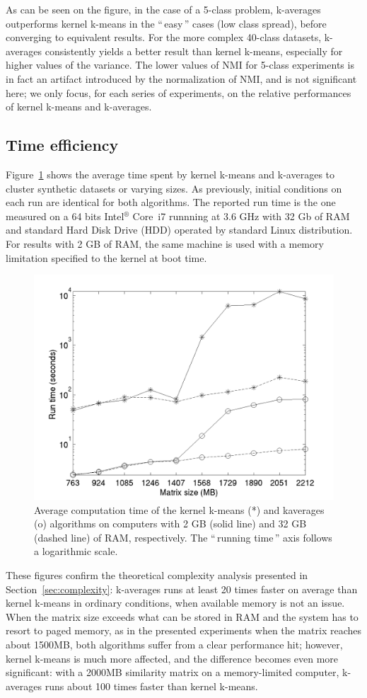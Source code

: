 \documentclass[twoside,11pt]{article}
\newcommand{\gl}[1]{``\,#1\,''} %
\begin{document}
As can be seen on the figure, in the case of a 5-class problem, k-averages outperforms kernel k-means in the \gl{easy} cases (low class spread), before converging to equivalent results. For the more complex 40-class datasets, k-averages consistently yields a better result than kernel k-means, especially for higher values of the variance. The lower values of NMI for 5-class experiments is in fact an artifact introduced by the normalization of NMI, and is not significant here; we only focus, for each series of experiments, on the relative performances of kernel k-means and k-averages.

\subsection{Time efficiency}

Figure~\ref{fig:timing} shows the average time spent by kernel k-means and k-averages to cluster synthetic datasets or varying sizes. As previously, initial conditions on each run are identical for both algorithms. The reported run time is the one measured on a 64 bits Intel$^\circledR$ Core\texttrademark   \, i7 runnning at 3.6 GHz with 32 Gb of RAM and standard Hard Disk Drive (HDD)  operated by standard Linux distribution. For results with 2 GB of RAM, the same machine is used with a memory limitation specified to the kernel at boot time.

\begin{figure}
\center
\includegraphics[width= .7\textwidth]{figures/simpleSwap.png} 
\caption{Average computation time of the kernel k-means (*) and kaverages (o) algorithms on computers with 2 GB (solid line) and 32 GB (dashed line) of RAM, respectively. The \gl{running time} axis follows a logarithmic scale.}
\label{fig:timing}
\end{figure}

These figures confirm the theoretical complexity analysis presented in Section~\ref{sec:complexity}: k-averages runs at least 20 times faster on average than kernel k-means in ordinary conditions, when  available memory is not an issue. When the matrix size exceeds what can be stored in RAM and the system has to resort to paged memory, as in the presented experiments when the matrix reaches about 1500MB, both algorithms suffer from a clear performance hit; however, kernel k-means is much more affected, and the difference becomes even more significant: with a 2000MB similarity matrix on a memory-limited computer, k-averages runs about 100 times faster than kernel k-means.
\end{document}
